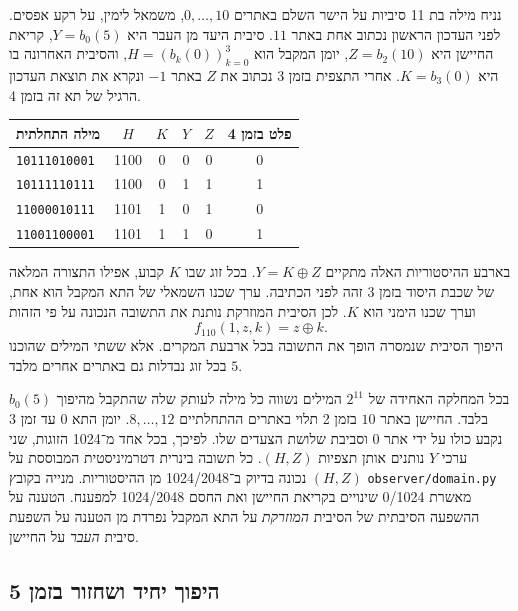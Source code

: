 \documentclass[11pt,a4paper]{article}
\DeclareRobustCommand{\textenglish}[1]{\foreignlanguage{english}{#1}}
\theoremstyle{definition}
\begin{document}
נניח מילה בת 11 סיביות על הישר השלם באתרים $0,\ldots,10$, משמאל לימין, על רקע אפסים. לפני העדכון הראשון נכתוב אחת באתר $11$. סיבית היעד מן העבר היא $Y=b_0(5)$, קריאת החיישן היא $Z=b_2(10)$, יומן המקבל הוא $H=(b_k(0))_{k=0}^3$, והסיבית האחרונה בו היא $K=b_3(0)$. אחרי התצפית בזמן 3 נכתוב את $Z$ באתר $-1$ ונקרא את תוצאת העדכון הרגיל של תא זה בזמן 4.

\begin{center}
\begin{tabular}{lccccc}
מילה התחלתית & $H$ & $K$ & $Y$ & $Z$ & פלט בזמן 4 \\
\hline
\textenglish{\texttt{10111010001}} & 1100 & 0 & 0 & 0 & 0 \\
\textenglish{\texttt{10111110111}} & 1100 & 0 & 1 & 1 & 1 \\
\textenglish{\texttt{11000010111}} & 1101 & 1 & 0 & 1 & 0 \\
\textenglish{\texttt{11001100001}} & 1101 & 1 & 1 & 0 & 1
\end{tabular}
\end{center}

בארבע ההיסטוריות האלה מתקיים $Y=K\oplus Z$. בכל זוג שבו $K$ קבוע, אפילו התצורה המלאה של שכבת היסוד בזמן 3 זהה לפני הכתיבה. ערך שכנו השמאלי של התא המקבל הוא אחת, וערך שכנו הימני הוא $K$. לכן הסיבית המוזרקת נותנת את התשובה הנכונה על פי הזהות
\begin{equation}
 f_{110}(1,z,k)=z\oplus k.
 \label{eq:observer-xor-gate}
\end{equation}
היפוך הסיבית שנמסרה הופך את התשובה בכל ארבעת המקרים. אלא ששתי המילים שהוכנו בכל זוג נבדלות גם באתרים אחרים מלבד $5$.

בכל המחלקה האחידה של $2^{11}$ המילים נשווה כל מילה לעותק שלה שהתקבל מהיפוך $b_0(5)$ בלבד. החיישן באתר $10$ בזמן 2 תלוי באתרים ההתחלתיים $8,\ldots,12$. יומן התא $0$ עד זמן 3 נקבע כולו על ידי אתר $0$ וסביבת שלושת הצעדים שלו. לפיכך, בכל אחד מ־1024 הזוגות, שני ערכי $Y$ נותנים אותן תצפיות $(H,Z)$. כל תשובה בינרית דטרמיניסטית המבוססת על $(H,Z)$ נכונה בדיוק ב־1024/2048 מן ההיסטוריות. מנייה בקובץ \textenglish{\nolinkurl{observer/domain.py}} מאשרת 0/1024 שינויים בקריאת החיישן ואת החסם 1024/2048 למפענח. הטענה על ההשפעה הסיבתית של הסיבית \emph{המוזרקת} על התא המקבל נפרדת מן הטענה על השפעת סיבית \emph{העבר} על החיישן.

\subsection{היפוך יחיד ושחזור בזמן 5}
\label{sec:observer-return}
\end{document}
